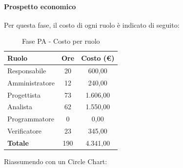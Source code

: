 \documentclass[../PianoProgetto.tex]{subfiles}
\begin{document}
	\paragraph{Prospetto economico}
					Per questa fase, il costo di ogni ruolo è indicato di seguito:
	\begin{table}[h]
		\centering
	
		\begin{tabular}{l * {2}{c}}
			\toprule
			\textbf{Ruolo} & \textbf{Ore} & \textbf{Costo (\euro{})} \\
			\midrule
			Responsabile &	20 & 600,00 \\
			Amministratore & 12 & 240,00 \\
			Progettista & 73 & 1.606,00 \\
			Analista & 62 & 1.550,00 \\
			Programmatore & 0 & 0,00 \\
			Verificatore & 23 & 345,00 \\
			\midrule		
			\textbf{Totale} & 190 & 4.341,00 \\
			\bottomrule
		\end{tabular}
		\caption{Fase PA - Costo per ruolo}
		\label{tab:fasePA_costo}
	\end{table}
\vfill	
	Riassumendo con un Circle Chart:
\end{document}
